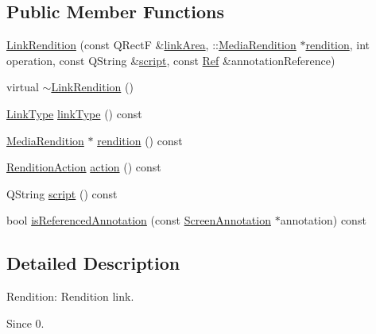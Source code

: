 \subsection*{Public Member Functions}
\begin{DoxyCompactItemize}
\item 
\hyperlink{class_poppler_1_1_link_rendition_a0bdeadebca128c8abc8b15e27bbc6e80}{Link\+Rendition} (const Q\+RectF \&\hyperlink{class_poppler_1_1_link_adb525b65cfac39dcdba3f59faa57a0bf}{link\+Area}, \+::\hyperlink{class_poppler_1_1_media_rendition}{Media\+Rendition} $\ast$\hyperlink{class_poppler_1_1_link_rendition_a907c5c1a9b88dde03bf5db1bc30ea188}{rendition}, int operation, const Q\+String \&\hyperlink{class_poppler_1_1_link_rendition_a9dbc0f397d4a72af93c6fabe9c1c3703}{script}, const \hyperlink{struct_ref}{Ref} \&annotation\+Reference)
\item 
virtual \hyperlink{class_poppler_1_1_link_rendition_a9cc8a311e5d3e0d2c7546e8c5f47c2b6}{$\sim$\+Link\+Rendition} ()
\item 
\hyperlink{class_poppler_1_1_link_af0dacfa77a548bb043dbae4bb9dc6c1e}{Link\+Type} \hyperlink{class_poppler_1_1_link_rendition_a4b43aec3a2a271aa40579e3f702ab91e}{link\+Type} () const
\item 
\hyperlink{class_poppler_1_1_media_rendition}{Media\+Rendition} $\ast$ \hyperlink{class_poppler_1_1_link_rendition_a907c5c1a9b88dde03bf5db1bc30ea188}{rendition} () const
\item 
\hyperlink{class_poppler_1_1_link_rendition_aede1a6b7156fe8973bdbeda39173704d}{Rendition\+Action} \hyperlink{class_poppler_1_1_link_rendition_a2bc7e91dae951604506d80861c4b8f3c}{action} () const
\item 
Q\+String \hyperlink{class_poppler_1_1_link_rendition_a9dbc0f397d4a72af93c6fabe9c1c3703}{script} () const
\item 
bool \hyperlink{class_poppler_1_1_link_rendition_a91fad039261a67d42a94b9284e8ef048}{is\+Referenced\+Annotation} (const \hyperlink{class_poppler_1_1_screen_annotation}{Screen\+Annotation} $\ast$annotation) const
\end{DoxyCompactItemize}


\subsection{Detailed Description}
Rendition\+: Rendition link.

\begin{DoxySince}{Since}
0. 
\end{DoxySince}


